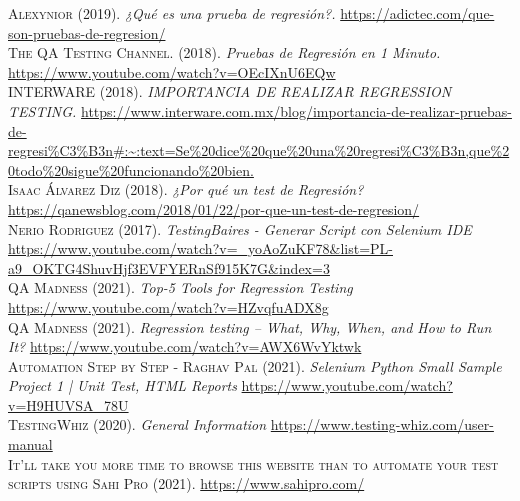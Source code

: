 \documentclass[conference]{IEEEtran}
\begin{document}
\begin{thebibliography}{}
 \textsc{Alexynior} (2019). \textit{¿Qué es una prueba de regresión?.} \url{https://adictec.com/que-son-pruebas-de-regresion/}\\

 \textsc{The QA Testing Channel.} (2018). \textit{Pruebas de Regresión en 1 Minuto.} \url{https://www.youtube.com/watch?v=OEcIXnU6EQw} \\


 \textsc{INTERWARE} (2018). \textit{IMPORTANCIA DE REALIZAR REGRESSION TESTING.} \url{https://www.interware.com.mx/blog/importancia-de-realizar-pruebas-de-regresi\%C3\%B3n\#:\~:text=Se\%20dice\%20que\%20una\%20regresi\%C3\%B3n,que\%20todo\%20sigue\%20funcionando\%20bien.} \\

 \textsc{Isaac Álvarez Diz} (2018). \textit{¿Por qué un test de Regresión?} \url{https://qanewsblog.com/2018/01/22/por-que-un-test-de-regresion/} \\


 \textsc{Nerio Rodriguez} (2017). \textit{TestingBaires - Generar Script con Selenium IDE} \url{https://www.youtube.com/watch?v=_yoAoZuKF78&list=PL-a9_OKTG4ShuvHjf3EVFYERnSf915K7G&index=3} \\

 \textsc{QA Madness} (2021). \textit{Top-5 Tools for Regression Testing} \url{https://www.youtube.com/watch?v=HZvqfuADX8g} \\

 \textsc{QA Madness} (2021). \textit{Regression testing – What, Why, When, and How to Run It?} \url{https://www.youtube.com/watch?v=AWX6WvYktwk} \\

 \textsc{Automation Step by Step - Raghav Pal} (2021). \textit{Selenium Python Small Sample Project 1 | Unit Test, HTML Reports} \url{https://www.youtube.com/watch?v=H9HUVSA_78U} \\

 \textsc{TestingWhiz} (2020). \textit{General Information} \url{https://www.testing-whiz.com/user-manual} \\

 \textsc{It'll take you more time to browse this website than to automate your test scripts using Sahi Pro} (2021). \url{https://www.sahipro.com/} \\


\end{thebibliography}
\end{document}
